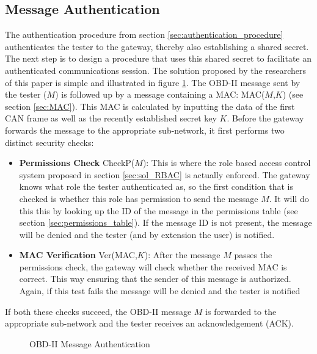 \subsection{Message Authentication}
\label{subsec:message_authentication}

The authentication procedure from section \ref{sec:authentication_procedure} authenticates the tester to the gateway, thereby also establishing a shared secret. The next step is to design a procedure that uses this shared secret to facilitate an authenticated communications session. The solution proposed by the researchers of this paper is simple and illustrated in figure \ref{fig:message_authentication}. The OBD-II message sent by the tester ($M$) is followed up by a message containing a MAC: MAC($M$,$K$) (see section \ref{sec:MAC}). This MAC is calculated by inputting the data of the first CAN frame as well as the recently established secret key $K$. Before the gateway forwards the message to the appropriate sub-network, it first performs two distinct security checks: 
\begin{itemize}
	\item \textbf{Permissions Check} CheckP($M$): This is where the role based access control system proposed in section \ref{sec:sol_RBAC} is actually enforced. The gateway knows what role the tester authenticated as, so the first condition that is checked is whether this role has permission to send the message $M$. It will do this this by looking up the ID of the message in the permissions table (see section \ref{sec:permissions_table}). If the message ID is not present, the message will be denied and the tester (and by extension the user) is notified.
	
	\item \textbf{MAC Verification} Ver(MAC,$K$): After the message $M$ passes the permissions check, the gateway will check whether the received MAC is correct. This way ensuring that the sender of this message is authorized. Again, if this test fails the message will be denied and the tester is notified
\end{itemize}
If both these checks succeed, the OBD-II message $M$ is forwarded to the appropriate sub-network and the tester receives an acknowledgement (ACK). 

\begin{figure}[h]
	\centering
	\caption{OBD-II Message Authentication}
	\label{fig:message_authentication}
\end{figure}

